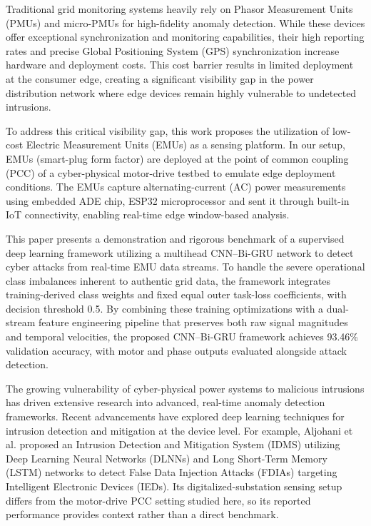 \documentclass[conference,letterpaper]{IEEEtran}
\begin{document}
Traditional grid monitoring systems heavily rely on Phasor Measurement Units (PMUs) and micro-PMUs for high-fidelity anomaly detection. While these devices offer exceptional synchronization and monitoring capabilities, their high reporting rates and precise Global Positioning System (GPS) synchronization increase hardware and deployment costs. This cost barrier results in limited deployment at the consumer edge, creating a significant visibility gap in the power distribution network where edge devices remain highly vulnerable to undetected intrusions.

To address this critical visibility gap, this work proposes the utilization of low-cost Electric Measurement Units (EMUs) as a sensing platform. In our setup, EMUs (smart-plug form factor) are deployed at the point of common coupling (PCC) of a cyber-physical motor-drive testbed to emulate edge deployment conditions. The EMUs capture alternating-current (AC) power measurements using embedded ADE chip, ESP32 microprocessor and sent it through built-in IoT connectivity, enabling real-time edge window-based analysis.

This paper presents a demonstration and rigorous benchmark of a supervised deep learning framework utilizing a multihead CNN--Bi-GRU network to detect cyber attacks from real-time EMU data streams. To handle the severe operational class imbalances inherent to authentic grid data, the framework integrates training-derived class weights and fixed equal outer task-loss coefficients, with decision threshold 0.5. By combining these training optimizations with a dual-stream feature engineering pipeline that preserves both raw signal magnitudes and temporal velocities, the proposed CNN--Bi-GRU framework achieves 93.46\% validation  accuracy, with motor and phase outputs evaluated alongside attack detection.

The growing vulnerability of cyber-physical power systems to malicious intrusions has driven extensive research into advanced, real-time anomaly detection frameworks. Recent advancements have explored deep learning techniques for intrusion detection and mitigation at the device level. For example, Aljohani et al. \cite{aljohani2024} proposed an Intrusion Detection and Mitigation System (IDMS) utilizing Deep Learning Neural Networks (DLNNs) and Long Short-Term Memory (LSTM) networks to detect False Data Injection Attacks (FDIAs) targeting Intelligent Electronic Devices (IEDs). Its digitalized-substation sensing setup differs from the motor-drive PCC setting studied here, so its reported performance provides context rather than a direct benchmark.
\end{document}
